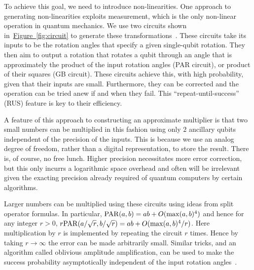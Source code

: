 \documentclass[conference]{IEEEtran}
\newcommand{\eq}[1]{Eq.~\hyperref[eq:#1]{(\ref*{eq:#1})}}
\newcommand{\fig}[1]{\hyperref[fig:#1]{Figure~\ref*{fig:#1}}}
\newcommand{\nix}[1]{{}}
\begin{document}
\nix{
Our solution to this problem is inspired in part from the Fourier adder.  The Fourier adder takes advantage of the fact that, for any $(a,b) \in \mathbb{R}^2$
\begin{equation}
e^{ia Z} e^{ib Z} =e^{i(a+b)Z}.\label{eq:phaseadd}
\end{equation}
This shows that if $f(x)$ is a sum then we can use this structure to implement~\eq{target} without requiring any additional ancillae.  However, in order to do this for more general functions we need to have the ability to perform a non-linear operation, such as multiplication.  Since quantum mechanics is a linear theory such non-linear operations a challenge to devise.
}
To achieve this goal, we need to introduce non-linearities.
One approach to generating non-linearities exploits measurement, which is the only non-linear operation in quantum mechanics.  We use two circuits shown in~\fig{circuit} to generate these transformations~\cite{WR16}.  These circuits take its inputs to be the rotation angles that specify a given single-qubit rotation.  They then aim to output a rotation that rotates a qubit through an angle that is approximately the product of the input rotation angles (PAR circuit), or product of their squares (GB circuit).  These circuits achieve this, with high probability, given that their inputs are small.  Furthermore, they can be corrected and the operation can be tried anew if and when they fail.  This ``repeat-until-success'' (RUS) feature is key to their efficiency.

A feature of this approach to constructing an approximate multiplier is that two small numbers can be multiplied in this fashion using only $2$ ancillary qubits independent of the precision of the inputs.  This is because we use an analog degree of freedom, rather than a digital representation, to store the result.  There is, of course, no free lunch.  Higher precision necessitates more error correction, but this only incurrs a logarithmic space overhead and often will be irrelevant given the exacting precision already required of quantum computers by certain algorithms.

Larger numbers can be multiplied using these circuits using ideas from split operator formulas.  In particular, ${\rm PAR}( a,b) = ab + O(\max(a,b)^4)$ and hence for any integer $r>0$,
$r{\rm PAR}(a/\sqrt{r},b/\sqrt{r})=ab + O(\max(a,b)^4/r)$.  Here multiplication by $r$ is implemented by repeating the circuit $r$ times.  Hence by taking $r\rightarrow \infty$ the error can be made arbitrarily small.  Similar tricks, and an algorithm called oblivious amplitude amplification, can be used to make the success probability asymptotically independent of the input rotation angles~\cite{WR16}.
\end{document}
